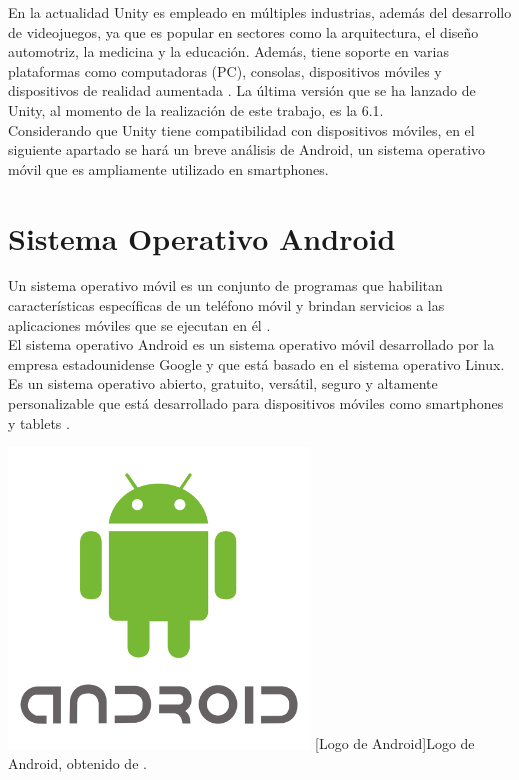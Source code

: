 En la actualidad Unity es empleado en múltiples industrias, además del desarrollo de videojuegos, ya que es popular en sectores como la arquitectura, el diseño automotriz, la medicina y la educación. Además, tiene soporte en varias plataformas como computadoras (PC), consolas, dispositivos móviles y dispositivos de realidad aumentada \cite{ref55}. La última versión que se ha lanzado de Unity, al momento de la realización de este trabajo, es la 6.1.\\

Considerando que Unity tiene compatibilidad con dispositivos móviles, en el siguiente apartado se hará un breve análisis de Android, un sistema operativo móvil que es ampliamente utilizado en smartphones.\\

\section{Sistema Operativo Android}
Un sistema operativo móvil es un conjunto de programas que habilitan características específicas de un teléfono móvil y brindan servicios a las aplicaciones móviles que se ejecutan en él \cite{ref57}.\\

El sistema operativo Android es un sistema operativo móvil desarrollado por la empresa estadounidense Google y que está basado en el sistema operativo Linux. Es un sistema operativo abierto, gratuito, versátil, seguro y altamente personalizable que está desarrollado para dispositivos móviles como smartphones y tablets \cite{ref57}.

\begin{center}
    \includegraphics[width=0.6\textwidth]{Images/Cap 2/Android_Logo.png}
    [Logo de Android]{Logo de Android, obtenido de \cite{ref58}.} 
\end{center}

